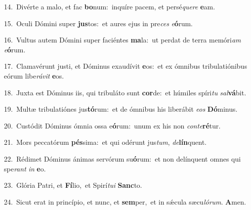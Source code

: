 {\numbfont\textcolor{\numbcolor}{14.}}~Divérte a malo, et fac \textbf{bo}\-num:~\star inquíre pacem, et persé\-\textit{que}\-\textit{re} \textbf{e}\-am.\par
{\numbfont\textcolor{\numbcolor}{15.}}~Oculi Dómini super \textbf{jus}\-tos:~\star et aures ejus in pre\textit{ces} \textit{e}\-\textbf{ó}rum.\par
{\numbfont\textcolor{\numbcolor}{16.}}~Vultus autem Dómini super faciéntes \textbf{ma}\-la:~\star ut perdat de terra memóri\textit{am} \textit{e}\-\textbf{ó}rum.\par
{\numbfont\textcolor{\numbcolor}{17.}}~Clamavérunt justi, et Dóminus exaudívit \textbf{e}\-os:~\star et ex ómnibus tribulatiónibus eórum libe\-\textit{rá}\-\textit{vit} \textbf{e}\-os.\par
{\numbfont\textcolor{\numbcolor}{18.}}~Juxta est Dóminus iis, qui tribuláto sunt \textbf{cor}\-de:~\star et húmiles spíri\textit{tu} \textit{sal}\-\textbf{vá}bit.\par
{\numbfont\textcolor{\numbcolor}{19.}}~Multæ tribulatiónes jus\-\textbf{tó}\-rum:~\star et de ómnibus his liberábit \textit{e}\-\textit{os} \textbf{Dó}\-minus.\par
{\numbfont\textcolor{\numbcolor}{20.}}~Custódit Dóminus ómnia ossa e\-\textbf{ó}\-rum:~\star unum ex his non \textit{con}\-\textit{te}\textbf{ré}tur.\par
{\numbfont\textcolor{\numbcolor}{21.}}~Mors peccatórum \textbf{pés}\-sima:~\star et qui odérunt jus\-\textit{tum}\-, \textit{de}\-\textbf{lín}quent.\par
{\numbfont\textcolor{\numbcolor}{22.}}~Rédimet Dóminus ánimas servórum su\-\textbf{ó}\-rum:~\star et non delínquent omnes qui spe\textit{rant} \textit{in} \textbf{e}\-o.\par
{\numbfont\textcolor{\numbcolor}{23.}}~Glória Patri, et \textbf{Fí}\-lio,~\star et Spirí\-\textit{tu}\-\textit{i} \textbf{Sanc}\-to.\par
{\numbfont\textcolor{\numbcolor}{24.}}~Sicut erat in princípio, et nunc, et \textbf{sem}\-per,~\star et in sǽcula sæcu\-\textit{ló}\-\textit{rum}. \textbf{A}\-men.\par

